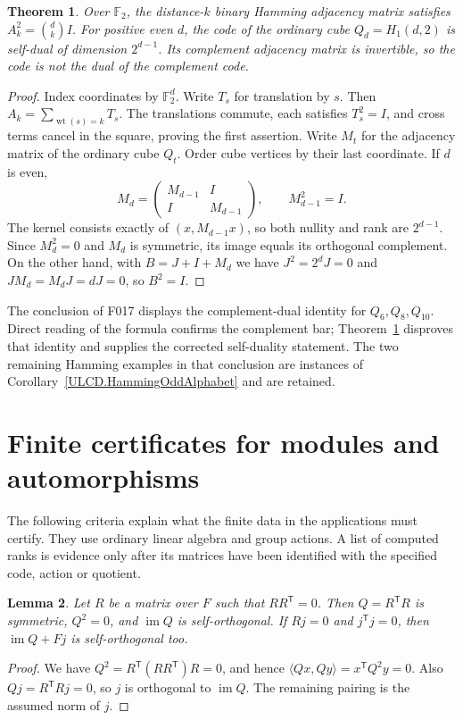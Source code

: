 \documentclass[11pt,a4paper]{article}
\newtheorem{theorem}{Theorem}[section]
\newtheorem{lemma}[theorem]{Lemma}
\numberwithin{equation}{section}
\newcommand{\im}{\operatorname{im}}
\newcommand{\wt}{\operatorname{wt}}
\begin{document}
\begin{theorem}\label{ULCD.Cube}
Over $\mathbb F_2$, the distance-$k$ binary Hamming adjacency matrix satisfies
$A_k^2=\binom dk I$. For positive even $d$, the code of the ordinary cube
$Q_d=H_1(d,2)$ is self-dual of dimension $2^{d-1}$. Its complement adjacency
matrix is invertible, so the code is not the dual of the complement code.
\end{theorem}
\begin{proof}
Index coordinates by $\mathbb F_2^d$. Write $T_s$ for translation by $s$.
Then $A_k=\sum_{\wt(s)=k}T_s$. The translations commute, each satisfies
$T_s^2=I$, and cross terms cancel in the square, proving the first assertion.
Write $M_t$ for the adjacency matrix of the ordinary cube $Q_t$.
Order cube vertices by their last coordinate. If $d$ is even,
\[
 M_d=\begin{pmatrix}M_{d-1}&I\\I&M_{d-1}\end{pmatrix},\qquad
 M_{d-1}^2=I.
\]
The kernel consists exactly of $(x,M_{d-1}x)$, so both nullity and rank are
$2^{d-1}$. Since $M_d^2=0$ and $M_d$ is symmetric, its image equals its
orthogonal complement. On the other hand, with $B=J+I+M_d$ we have
$J^2=2^dJ=0$ and $JM_d=M_dJ=dJ=0$, so $B^2=I$.
\end{proof}

The conclusion of F017 displays the complement-dual identity for
$Q_6,Q_8,Q_{10}$. Direct reading of the formula confirms the complement bar;
Theorem~\ref{ULCD.Cube} disproves that identity and supplies the corrected
self-duality statement. The two remaining Hamming examples in that
conclusion are instances of Corollary~\ref{ULCD.HammingOddAlphabet} and are retained.

\section{Finite certificates for modules and automorphisms}

The following criteria explain what the finite data in the applications
must certify. They use ordinary linear algebra and group actions. A list
of computed ranks is evidence only after its matrices have been identified
with the specified code, action or quotient.

\begin{lemma}\label{ULCD.SquareZeroIncidence}
Let $R$ be a matrix over $F$ such that $RR^{\mathsf T}=0$. Then
$Q=R^{\mathsf T}R$ is symmetric, $Q^2=0$, and $\im Q$ is self-orthogonal.
If $Rj=0$ and $j^{\mathsf T}j=0$, then $\im Q+Fj$ is self-orthogonal too.
\end{lemma}
\begin{proof}
We have $Q^2=R^{\mathsf T}(RR^{\mathsf T})R=0$, and hence
$\langle Qx,Qy\rangle=x^{\mathsf T}Q^2y=0$.
Also $Qj=R^{\mathsf T}Rj=0$, so $j$ is orthogonal to $\im Q$.
The remaining pairing is the assumed norm of $j$.
\end{proof}
\end{document}
